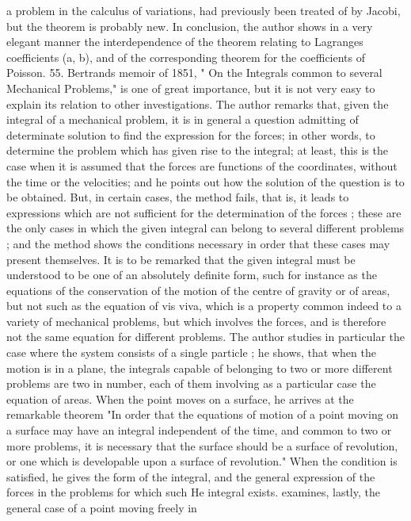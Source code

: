 \documentclass[11pt,a4paper]{book}
\begin{document}

a problem in the calculus of variations, had previously been treated of by Jacobi, but
the theorem is probably new. In conclusion, the author shows in a very elegant
manner the interdependence of the theorem relating to Lagranges coefficients (a, b),
and of the corresponding theorem for the coefficients of Poisson.
55. Bertrands memoir of 1851, " On the Integrals common to several Mechanical
Problems," is one of great importance, but it is not very easy to explain its relation
to other investigations. The author remarks that, given the integral of a mechanical
problem, it is in general a question admitting of determinate solution to find the
expression for the forces; in other words, to determine the problem which has given
rise to the integral; at least, this is the case when it is assumed that the forces
are functions of the coordinates, without the time or the velocities; and he points out
how the solution of the question is to be obtained. But, in certain cases, the method
fails, that is, it leads to expressions which are not sufficient for the determination of
the forces ; these are the only cases in which the given integral can belong to
several different problems ; and the method shows the conditions necessary in order that
these cases may present themselves. It is to be remarked that the given integral must
be understood to be one of an absolutely definite form, such for instance as the
equations of the conservation of the motion of the centre of gravity or of areas, but
not such as the equation of vis viva, which is a property common indeed to a variety
of mechanical problems, but which involves the forces, and is therefore not the same
equation for different problems. The author studies in particular the case where the
system consists of a single particle ; he shows, that when the motion is in a plane,
the integrals capable of belonging to two or more different problems are two in
number, each of them involving as a particular case the equation of areas. When
the point moves on a surface, he arrives at the remarkable theorem "In order that
the equations of motion of a point moving on a surface may have an
integral
independent of the time, and common to two or more problems, it is necessary that
the surface should be a surface of revolution, or one which is developable upon a
surface of revolution." When the condition is satisfied, he gives the form of the
integral, and the general expression of the forces in the problems for which such
He
integral exists. examines, lastly, the general case of a point moving freely in
\end{document}
